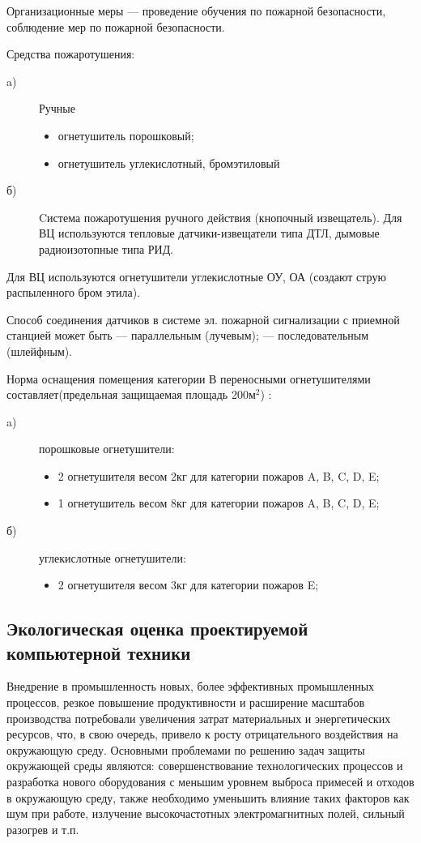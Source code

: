 Организационные меры — проведение обучения по пожарной безопасности, соблюдение мер по пожарной безопасности.

Средства пожаротушения:
\begin{description}
\item[a)]Ручные
	\begin{itemize}
	\item огнетушитель порошковый;
	\item огнетушитель углекислотный, бромэтиловый
	\end{itemize}

\item[б)] Cистема пожаротушения ручного действия (кнопочный извещатель).
Для ВЦ используются тепловые датчики-извещатели типа ДТЛ, дымовые радиоизотопные типа РИД.
\end{description}

Для ВЦ используются огнетушители углекислотные ОУ, ОА (создают струю распыленного бром этила).

Способ соединения датчиков в системе эл. пожарной сигнализации с приемной станцией может быть — параллельным (лучевым);
— последовательным (шлейфным).

Норма оснащения помещения категории В  переносными огнетушителями составляет(предельная защищаемая площадь 200м$^2$) 
\cite{bjd421}:
\begin{description}

	\item[a)] порошковые огнетушители:
		\begin{itemize}
		\item 2 огнетушителя весом 2кг для категории пожаров A, B, C, D, E;
		\item 1 огнетушитель весом 8кг для категории пожаров A, B, C, D, E;
		\end{itemize}
	\item[б)] 	углекислотные огнетушители:
		\begin{itemize}
		\item 2 огнетушителя весом 3кг для категории пожаров E;
		\end{itemize}

\end{description}

\subsection{Экологическая оценка проектируемой компьютерной техники}
Внедрение в промышленность новых, более эффективных промышленных процессов, резкое повышение продуктивности и расширение
масштабов производства потребовали увеличения затрат материальных и энергетических ресурсов, что, в свою очередь,
привело к росту отрицательного воздействия на окружающую среду. Основными проблемами по решению задач защиты окружающей
среды являются: совершенствование технологических процессов и разработка нового оборудования с меньшим уровнем выброса
примесей и отходов в окружающую среду, также необходимо уменьшить влияние таких факторов как шум при работе, излучение
высокочастотных электромагнитных полей, сильный разогрев и т.п.

